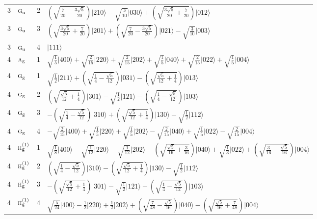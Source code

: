 \documentclass[11pt]{article}
\newcommand{\irr}[1]{\text{\normalfont\scshape #1}}
\newcommand{\ptag}[1]{\mathrm{#1}}
\newcommand{\occ}[1]{\lvert #1\rangle}
\begin{document}
\begin{longtable}{c l c p{}}
3 & $\irr{g}_{\ptag{u}}$ & 2 & $(\sqrt{\frac{7}{20} - \frac{3 \sqrt{5}}{20}})\occ{210}-\sqrt{\tfrac{3}{10}}\occ{030}+(\sqrt{\frac{3 \sqrt{5}}{20} + \frac{7}{20}})\occ{012}$\\
3 & $\irr{g}_{\ptag{u}}$ & 3 & $(\sqrt{\frac{3 \sqrt{5}}{20} + \frac{7}{20}})\occ{201}+(\sqrt{\frac{7}{20} - \frac{3 \sqrt{5}}{20}})\occ{021}-\sqrt{\tfrac{3}{10}}\occ{003}$\\
3 & $\irr{g}_{\ptag{u}}$ & 4 & $\occ{111}$\\
\hline
4 & $\irr{a}_{\ptag{g}}$ & 1 & $\sqrt{\tfrac{1}{5}}\occ{400}+\sqrt{\tfrac{2}{15}}\occ{220}+\sqrt{\tfrac{2}{15}}\occ{202}+\sqrt{\tfrac{1}{5}}\occ{040}+\sqrt{\tfrac{2}{15}}\occ{022}+\sqrt{\tfrac{1}{5}}\occ{004}$\\
4 & $\irr{g}_{\ptag{g}}$ & 1 & $\sqrt{\tfrac{1}{2}}\occ{211}+(\sqrt{\frac{1}{4} - \frac{\sqrt{5}}{12}})\occ{031}-(\sqrt{\frac{\sqrt{5}}{12} + \frac{1}{4}})\occ{013}$\\
4 & $\irr{g}_{\ptag{g}}$ & 2 & $(\sqrt{\frac{\sqrt{5}}{12} + \frac{1}{4}})\occ{301}-\sqrt{\tfrac{1}{2}}\occ{121}-(\sqrt{\frac{1}{4} - \frac{\sqrt{5}}{12}})\occ{103}$\\
4 & $\irr{g}_{\ptag{g}}$ & 3 & $-(\sqrt{\frac{1}{4} - \frac{\sqrt{5}}{12}})\occ{310}+(\sqrt{\frac{\sqrt{5}}{12} + \frac{1}{4}})\occ{130}-\sqrt{\tfrac{1}{2}}\occ{112}$\\
4 & $\irr{g}_{\ptag{g}}$ & 4 & $-\sqrt{\tfrac{2}{15}}\occ{400}+\sqrt{\tfrac{1}{5}}\occ{220}+\sqrt{\tfrac{1}{5}}\occ{202}-\sqrt{\tfrac{2}{15}}\occ{040}+\sqrt{\tfrac{1}{5}}\occ{022}-\sqrt{\tfrac{2}{15}}\occ{004}$\\
4 & $\irr{h}_{\ptag{g}}^{(1)}$ & 1 & $\sqrt{\tfrac{1}{8}}\occ{400}-\sqrt{\tfrac{1}{12}}\occ{220}-\sqrt{\tfrac{1}{12}}\occ{202}-(\sqrt{\frac{\sqrt{5}}{16} + \frac{3}{16}})\occ{040}+\sqrt{\tfrac{1}{3}}\occ{022}+(\sqrt{\frac{3}{16} - \frac{\sqrt{5}}{16}})\occ{004}$\\
4 & $\irr{h}_{\ptag{g}}^{(1)}$ & 2 & $(\sqrt{\frac{1}{4} - \frac{\sqrt{5}}{12}})\occ{310}-(\sqrt{\frac{\sqrt{5}}{12} + \frac{1}{4}})\occ{130}-\sqrt{\tfrac{1}{2}}\occ{112}$\\
4 & $\irr{h}_{\ptag{g}}^{(1)}$ & 3 & $-(\sqrt{\frac{\sqrt{5}}{12} + \frac{1}{4}})\occ{301}-\sqrt{\tfrac{1}{2}}\occ{121}+(\sqrt{\frac{1}{4} - \frac{\sqrt{5}}{12}})\occ{103}$\\
4 & $\irr{h}_{\ptag{g}}^{(1)}$ & 4 & $\sqrt{\tfrac{5}{24}}\occ{400}-\tfrac{1}{2}\occ{220}+\tfrac{1}{2}\occ{202}+(\sqrt{\frac{7}{48} - \frac{\sqrt{5}}{16}})\occ{040}-(\sqrt{\frac{\sqrt{5}}{16} + \frac{7}{48}})\occ{004}$\\

\end{longtable}
\end{document}

